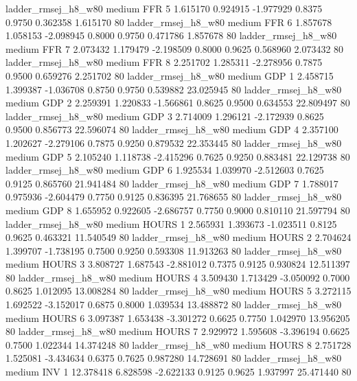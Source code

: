    ladder_rmsej_h8_w80     medium      FFR                 5  1.615170 0.924915 -1.977929 0.8375 0.9750  0.362358    1.615170 80
   ladder_rmsej_h8_w80     medium      FFR                 6  1.857678 1.058153 -2.098945 0.8000 0.9750  0.471786    1.857678 80
   ladder_rmsej_h8_w80     medium      FFR                 7  2.073432 1.179479 -2.198509 0.8000 0.9625  0.568960    2.073432 80
   ladder_rmsej_h8_w80     medium      FFR                 8  2.251702 1.285311 -2.278956 0.7875 0.9500  0.659276    2.251702 80
   ladder_rmsej_h8_w80     medium      GDP                 1  2.458715 1.399387 -1.036708 0.8750 0.9750  0.539882   23.025945 80
   ladder_rmsej_h8_w80     medium      GDP                 2  2.259391 1.220833 -1.566861 0.8625 0.9500  0.634553   22.809497 80
   ladder_rmsej_h8_w80     medium      GDP                 3  2.714009 1.296121 -2.172939 0.8625 0.9500  0.856773   22.596074 80
   ladder_rmsej_h8_w80     medium      GDP                 4  2.357100 1.202627 -2.279106 0.7875 0.9250  0.879532   22.353445 80
   ladder_rmsej_h8_w80     medium      GDP                 5  2.105240 1.118738 -2.415296 0.7625 0.9250  0.883481   22.129738 80
   ladder_rmsej_h8_w80     medium      GDP                 6  1.925534 1.039970 -2.512603 0.7625 0.9125  0.865760   21.941484 80
   ladder_rmsej_h8_w80     medium      GDP                 7  1.788017 0.975936 -2.604479 0.7750 0.9125  0.836395   21.768655 80
   ladder_rmsej_h8_w80     medium      GDP                 8  1.655952 0.922605 -2.686757 0.7750 0.9000  0.810110   21.597794 80
   ladder_rmsej_h8_w80     medium    HOURS                 1  2.565931 1.393673 -1.023511 0.8125 0.9625  0.463321   11.540549 80
   ladder_rmsej_h8_w80     medium    HOURS                 2  2.704624 1.399707 -1.738195 0.7500 0.9250  0.593308   11.913263 80
   ladder_rmsej_h8_w80     medium    HOURS                 3  3.808727 1.687543 -2.881012 0.7375 0.9125  0.930824   12.511397 80
   ladder_rmsej_h8_w80     medium    HOURS                 4  3.509430 1.713429 -3.050092 0.7000 0.8625  1.012095   13.008284 80
   ladder_rmsej_h8_w80     medium    HOURS                 5  3.272115 1.692522 -3.152017 0.6875 0.8000  1.039534   13.488872 80
   ladder_rmsej_h8_w80     medium    HOURS                 6  3.097387 1.653438 -3.301272 0.6625 0.7750  1.042970   13.956205 80
   ladder_rmsej_h8_w80     medium    HOURS                 7  2.929972 1.595608 -3.396194 0.6625 0.7500  1.022344   14.374248 80
   ladder_rmsej_h8_w80     medium    HOURS                 8  2.751728 1.525081 -3.434634 0.6375 0.7625  0.987280   14.728691 80
   ladder_rmsej_h8_w80     medium      INV                 1 12.378418 6.828598 -2.622133 0.9125 0.9625  1.937997   25.471440 80
